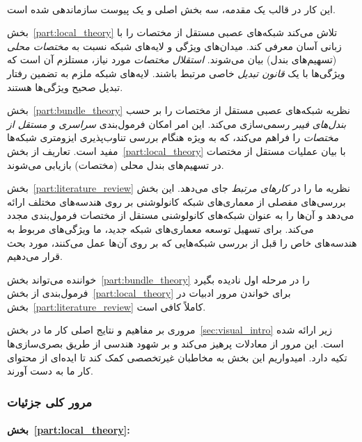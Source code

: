 

\setcounter{tocdepth}{2} %
\tableofcontents

~ %

این کار در قالب یک مقدمه، سه بخش اصلی و یک پیوست سازماندهی شده است.

بخش~\ref{part:local_theory} تلاش می‌کند شبکه‌های عصبی مستقل از مختصات را با زبانی آسان معرفی کند.
میدان‌های ویژگی و لایه‌های شبکه نسبت به \emph{مختصات محلی} (تسهیم‌های بندل) بیان می‌شوند.
\emph{استقلال مختصات} مورد نیاز، مستلزم آن است که ویژگی‌ها با یک \emph{قانون تبدیل} خاصی مرتبط باشند.
لایه‌های شبکه ملزم به تضمین رفتار تبدیل صحیح ویژگی‌ها هستند.

بخش~\ref{part:bundle_theory} نظریه شبکه‌های عصبی مستقل از مختصات را بر حسب \emph{بندل‌های فیبر} رسمی‌سازی می‌کند.
این امر امکان فرمول‌بندی \emph{سراسری و مستقل از مختصات} را فراهم می‌کند، که به ویژه هنگام بررسی تناوب‌پذیری ایزومتری شبکه‌ها مفید است.
تعاریف از بخش~\ref{part:local_theory} با بیان عملیات مستقل از مختصات در تسهیم‌های بندل محلی (مختصات) بازیابی می‌شوند.

بخش~\ref{part:literature_review} نظریه ما را در \emph{کارهای مرتبط} جای می‌دهد.
این بخش بررسی‌های مفصلی از معماری‌های شبکه کانولوشنی بر روی هندسه‌های مختلف ارائه می‌دهد و آن‌ها را به عنوان شبکه‌های کانولوشنی مستقل از مختصات فرمول‌بندی مجدد می‌کند.
برای تسهیل توسعه معماری‌های شبکه جدید، ما ویژگی‌های مربوط به هندسه‌های خاص را قبل از بررسی شبکه‌هایی که بر روی آن‌ها عمل می‌کنند، مورد بحث قرار می‌دهیم.

خواننده می‌تواند بخش~\ref{part:bundle_theory} را در مرحله اول نادیده بگیرد
فرمول‌بندی از بخش~\ref{part:local_theory} برای خواندن مرور ادبیات در بخش~\ref{part:literature_review} کاملاً کافی است.

مروری بر مفاهیم و نتایج اصلی کار ما در بخش~\ref{sec:visual_intro} زیر ارائه شده است.
این مرور از معادلات پرهیز می‌کند و بر شهود هندسی از طریق بصری‌سازی‌ها تکیه دارد.
امیدواریم این بخش به مخاطبان غیرتخصصی کمک کند تا ایده‌ای از محتوای کار ما به دست آورند.


\subsubsection*{مرور کلی جزئیات}


\paragraph{بخش~\ref{part:local_theory}:}

